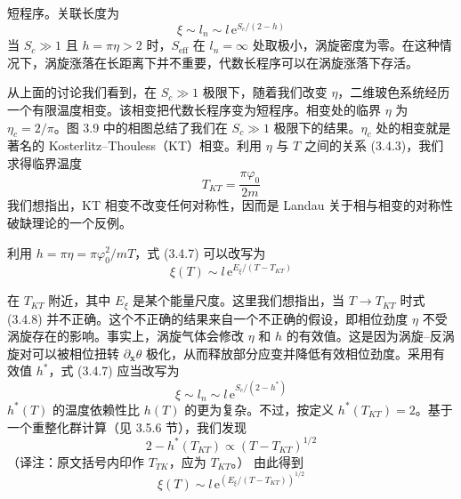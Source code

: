 短程序。关联长度为
\begin{equation*}
\xi \sim l_{n} \sim l\,\mathrm{e}^{S_{c}/(2-h)}
\tag{3.4.7}
\end{equation*}
当 $S_{c} \gg 1$ 且 $h = \pi\eta > 2$ 时，$S_{\mathrm{eff}}$ 在 $l_{n} = \infty$ 处取极小，涡旋密度为零。在这种情况下，涡旋涨落在长距离下并不重要，代数长程序可以在涡旋涨落下存活。

从上面的讨论我们看到，在 $S_{c} \gg 1$ 极限下，随着我们改变 $\eta$，二维玻色系统经历一个有限温度相变。该相变把代数长程序变为短程序。相变处的临界 $\eta$ 为 $\eta_{c} = 2/\pi$。图 3.9 中的相图总结了我们在 $S_{c} \gg 1$ 极限下的结果。$\eta_{c}$ 处的相变就是著名的 Kosterlitz--Thouless（KT）相变。利用 $\eta$ 与 $T$ 之间的关系 (3.4.3)，我们求得临界温度
\begin{equation*}
T_{KT} = \frac{\pi\varphi_{0}}{2m}
\end{equation*}
我们想指出，KT 相变不改变任何对称性，因而是 Landau 关于相与相变的对称性破缺理论的一个反例。

利用 $h = \pi\eta = \pi\varphi_{0}^{2}/mT$，式 (3.4.7) 可以改写为
\begin{equation*}
\xi(T) \sim l\,\mathrm{e}^{E_{\xi}/(T-T_{KT})}
\tag{3.4.8}
\end{equation*}

\begin{smallnote}
在 $T_{KT}$ 附近，其中 $E_{\xi}$ 是某个能量尺度。这里我们想指出，当 $T \to T_{KT}$ 时式 (3.4.8) 并不正确。这个不正确的结果来自一个不正确的假设，即相位劲度 $\eta$ 不受涡旋存在的影响。事实上，涡旋气体会修改 $\eta$ 和 $h$ 的有效值。这是因为涡旋--反涡旋对可以被相位扭转 $\partial_{\pmb{x}}\theta$ 极化，从而释放部分应变并降低有效相位劲度。采用有效值 $h^{*}$，式 (3.4.7) 应当改写为
\begin{equation*}
\xi \sim l_{n} \sim l\,\mathrm{e}^{S_{c}/(2-h^{*})}
\tag{3.4.9}
\end{equation*}
$h^{*}(T)$ 的温度依赖性比 $h(T)$ 的更为复杂。不过，按定义 $h^{*}(T_{KT}) = 2$。基于一个重整化群计算（见 3.5.6 节），我们发现
\begin{equation*}
2 - h^{*}(T_{KT}) \propto (T - T_{KT})^{1/2}
\end{equation*}
（译注：原文括号内印作 $T_{TK}$，应为 $T_{KT}$。）
由此得到
\begin{equation*}
\xi(T) \sim l\,\mathrm{e}^{\left(E_{\xi}/(T-T_{KT})\right)^{1/2}}
\tag{3.4.10}
\end{equation*}
\end{smallnote}

